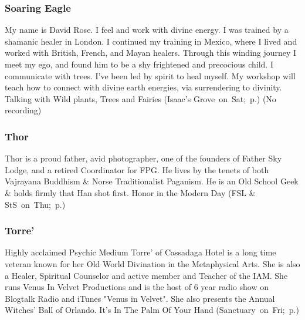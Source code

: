 \vspace{6pt}

\subsubsection{Soaring Eagle} %
{  \small  My name is David Rose. I feel and work with divine energy. I was trained by a shamanic healer in London. I continued my training in Mexico, where I lived and worked with British, French, and Mayan healers. Through this winding journey I meet my ego, and found him to be a shy frightened and precocious child. I communicate with trees. I've been led by spirit to heal myself. My workshop will teach how to connect with divine earth energies, via surrendering to divinity.  } %
\hspace{2em} {\footnotesize Talking with Wild plants, Trees and Fairies (Isaac's Grove~on~Sat;~p.\pageref{Sat-Eagle1})}
 {\small (No recording)} 

\vspace{6pt}

\subsubsection{Thor} %
{  \small  Thor is a proud father, avid photographer, one of the founders of Father Sky Lodge, and a retired Coordinator for FPG. He lives by the tenets of both Vajrayana Buddhism \& Norse Traditionalist Paganism. He is an Old School Geek \& holds firmly that Han shot first. } %
\hspace{2em} {\footnotesize Honor in the Modern Day (FSL \& StS~on~Thu;~p.\pageref{Thu-Thor1})}

\vspace{6pt}

\subsubsection{Torre'} %
{  \small  Highly acclaimed Psychic Medium Torre' of Cassadaga Hotel is a long time veteran known for her Old World Divination in the Metaphysical Arts.  She is also a Healer, Spiritual Counselor and active member and Teacher of the IAM. She runs Venus In Velvet Productions and is the host of 6 year radio show on Blogtalk Radio and iTunes "Venus in Velvet". She also presents the Annual Witches' Ball of Orlando. } %
\hspace{2em} {\footnotesize It's In The Palm Of Your Hand (Sanctuary~on~Fri;~p.\pageref{Fri-Torre1})}

\vspace{6pt}
